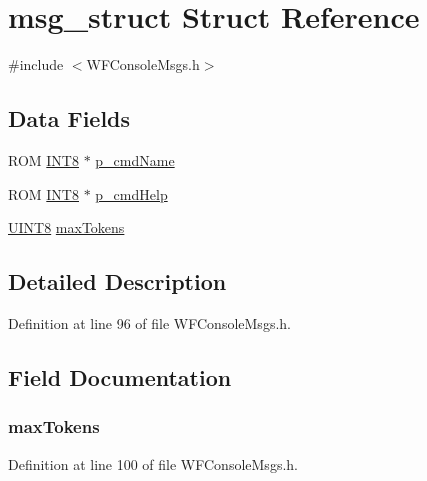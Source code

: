 \hypertarget{structmsg__struct}{}\section{msg\+\_\+struct Struct Reference}
\label{structmsg__struct}


{\ttfamily \#include $<$W\+F\+Console\+Msgs.\+h$>$}

\subsection*{Data Fields}
\begin{DoxyCompactItemize}
\item 
R\+O\+M \hyperlink{_generic_type_defs_8h_a7ebe70ceca856797319175e30bcf003d}{I\+N\+T8} $\ast$ \hyperlink{structmsg__struct_a2fecdf415b87c24720fb3dce6dce8eb9}{p\+\_\+cmd\+Name}
\item 
R\+O\+M \hyperlink{_generic_type_defs_8h_a7ebe70ceca856797319175e30bcf003d}{I\+N\+T8} $\ast$ \hyperlink{structmsg__struct_a0c7a0ebc03bca2a6d3b2debad125ff67}{p\+\_\+cmd\+Help}
\item 
\hyperlink{_generic_type_defs_8h_ab27e9918b538ce9d8ca692479b375b6a}{U\+I\+N\+T8} \hyperlink{structmsg__struct_a8274440cda26945eb238cd43f0249ca9}{max\+Tokens}
\end{DoxyCompactItemize}


\subsection{Detailed Description}


Definition at line 96 of file W\+F\+Console\+Msgs.\+h.



\subsection{Field Documentation}
\hypertarget{structmsg__struct_a8274440cda26945eb238cd43f0249ca9}{}
\subsubsection[{max\+Tokens}]{ max\+Tokens}\label{structmsg__struct_a8274440cda26945eb238cd43f0249ca9}


Definition at line 100 of file W\+F\+Console\+Msgs.\+h.

